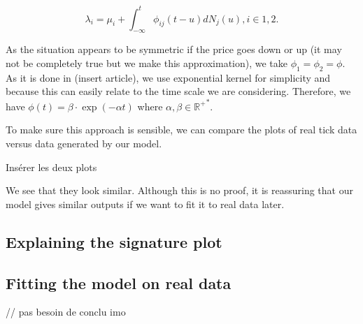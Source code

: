\documentclass[a4paper,12pt,twoside]{article}
\begin{document}
\begin{equation} \lambda_i = \mu_i + \int_{-\infty}^{t} \phi_{ij}(t-u)dN_j(u), i \in {1, 2}.
\end{equation}

As the situation appears to be symmetric if the price goes down or up (it may not be completely true but we make this approximation), we take $\phi_1 = \phi_2 = \phi$. As it is done in (insert article), we use exponential kernel for simplicity and because this can easily relate to the time scale we are considering. Therefore, we have $\phi(t) = \beta \cdot \exp(-\alpha t)$ where $\alpha, \beta \in \mathbb{{R^{+}}^*}$.

To make sure this approach is sensible, we can compare the plots of real tick data versus data generated by our model. 

Insérer les deux plots

We see that they look similar. Although this is no proof, it is reassuring that our model gives similar outputs if we want to fit it to real data later.

\subsection{Explaining the signature plot}



\subsection{Fitting the model on real data}


// pas besoin de conclu imo

\begin{thebibliography}{}
    
    
\end{thebibliography}	
\end{document}
